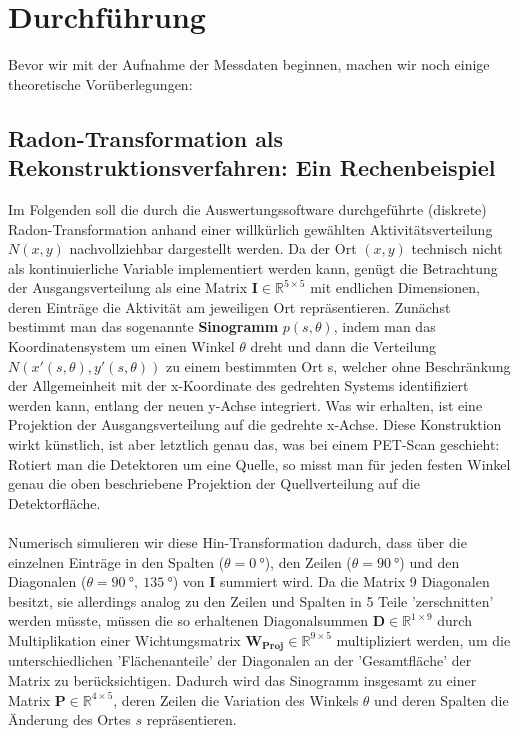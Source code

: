 \section{Durchführung}
Bevor wir mit der Aufnahme der Messdaten beginnen, machen wir noch einige theoretische Vorüberlegungen:
\subsection{Radon-Transformation als Rekonstruktionsverfahren: Ein Rechenbeispiel} \label{dfs:Radon}
        Im Folgenden soll die durch die Auswertungssoftware durchgeführte (diskrete) Radon-Transformation anhand einer willkürlich gewählten Aktivitätsverteilung $N(x,y)$ nachvollziehbar dargestellt werden. Da der Ort $(x,y)$ technisch nicht als kontinuierliche Variable implementiert werden kann, genügt die Betrachtung der Ausgangsverteilung als eine Matrix $\boldsymbol{I} \in \mathbb{R}^{5 \times 5}$ mit endlichen Dimensionen, deren Einträge die Aktivität am jeweiligen Ort repräsentieren. Zunächst bestimmt man das sogenannte \textbf{Sinogramm} $p(s, \theta)$, indem man das Koordinatensystem um einen Winkel $\theta$ dreht und dann die Verteilung $N(x'(s,\theta),y'(s,\theta))$ zu einem bestimmten Ort s, welcher ohne Beschränkung der Allgemeinheit mit der x-Koordinate des gedrehten Systems identifiziert werden kann, entlang der neuen y-Achse integriert. Was wir erhalten, ist eine Projektion der Ausgangsverteilung auf die gedrehte x-Achse. Diese Konstruktion wirkt künstlich, ist aber letztlich genau das, was bei einem PET-Scan geschieht: Rotiert man die Detektoren um eine Quelle, so misst man für jeden festen Winkel genau die oben beschriebene Projektion der Quellverteilung auf die Detektorfläche.\\
        \ \\
         Numerisch simulieren wir diese Hin-Transformation dadurch, dass über die einzelnen Einträge in den Spalten ($\theta = 0\ \unit{°}$), den Zeilen ($\theta = 90\ \unit{°}$) und den Diagonalen ($\theta = 90\ \unit{°},\ 135\ \unit{°}$) von $\boldsymbol{I}$ summiert wird. Da die Matrix 9 Diagonalen besitzt, sie allerdings analog zu den Zeilen und Spalten in 5 Teile 'zerschnitten' werden müsste, müssen die so erhaltenen Diagonalsummen $\boldsymbol{D} \in \mathbb{R}^{1 \times 9}$  durch Multiplikation einer Wichtungsmatrix $\boldsymbol{W_{Proj}} \in \mathbb{R}^{9 \times 5}$ multipliziert werden, um die unterschiedlichen 'Flächenanteile' der Diagonalen an der 'Gesamtfläche' der Matrix zu berücksichtigen. Dadurch wird das Sinogramm insgesamt zu einer Matrix $\boldsymbol{P} \in \mathbb{R}^{4 \times 5}$, deren Zeilen die Variation des Winkels $\theta$ und deren Spalten die Änderung des Ortes $s$ repräsentieren.\\
